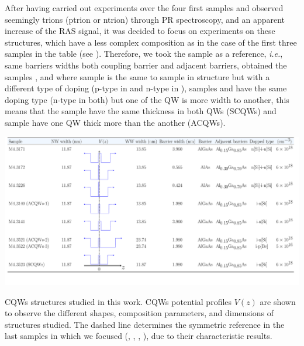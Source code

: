 After having carried out experiments over the four first samples and observed seemingly trions (\gls{ptrion} or \gls{ntrion}) through \gls{PR} spectroscopy, and an apparent increase of the \gls{RAS} signal, it was decided
to focus on experiments on these structures, which have a less complex composition as
in the case of the first three samples in the table (see ). Therefore, we took the sample  as a reference, \textit{i.e.}, same barriers widths both coupling barrier and adjacent
barriers, obtained the samples ,  and  where sample 
is the same to sample  in structure but with a different type of doping (p-type in
 and n-type in ), samples  and  have the same doping
type (n-type in both) but one of the \gls{QW} is more width to another, this means that the
sample  have the same thickness in both QWs (SCQWs) and sample 
have one \gls{QW} thick more than the another (\gls{ACQWs}).
\begin{landscape}
	\begin{table}
		\centering
		\includegraphics[width=\textwidth]{../tables/chapter-3/table-1-samples/build-ruco/table-1-samples.pdf}
		\caption[Table of samples description]{CQWs structures studied in this work.  CQWs potential profiles $V(z)$ are shown to observe the different shapes, composition parameters, and dimensions of structures studied. The dashed line determines the symmetric reference in the last samples in which we focused (\tucu, \tcvu, \tcvd, \tcvt), due to their characteristic results. }
		\label{tab:chapter3:Samples description} 
	\end{table}
\end{landscape}
